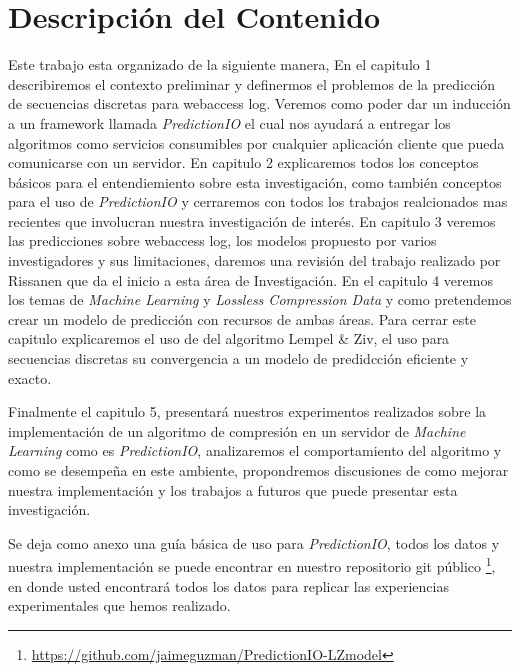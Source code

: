 \section{Descripción del Contenido}

Este trabajo esta organizado de la siguiente manera, En el capitulo 1 describiremos el contexto preliminar y definermos el problemos de la predicción de secuencias discretas para webaccess log. Veremos como poder dar un inducción a un framework llamada \emph{PredictionIO} el cual nos ayudará a entregar los algoritmos como servicios consumibles por cualquier aplicación cliente que pueda comunicarse con un servidor.
En capitulo 2 explicaremos todos los conceptos básicos para el entendiemiento sobre esta investigación, como también conceptos para el uso de \emph{PredictionIO} y cerraremos con todos los trabajos  realcionados mas recientes que involucran nuestra investigación de interés. En capitulo 3 veremos las predicciones sobre webaccess log, los modelos propuesto por varios investigadores y sus limitaciones, daremos una revisión del trabajo realizado por Rissanen\cite{Rissanen1984} que da el inicio a esta área de Investigación.
En el capitulo 4 veremos los temas de \emph{Machine Learning} y \emph{Lossless Compression Data} y como pretendemos crear un modelo de predicción con recursos de ambas áreas. Para cerrar este capitulo explicaremos el uso de del algoritmo Lempel \& Ziv, el uso para secuencias discretas su convergencia a un modelo de predidcción eficiente y exacto. 

Finalmente el capitulo 5, presentará nuestros experimentos realizados sobre la implementación de un algoritmo de compresión en un servidor de \emph{Machine Learning} como es \emph{PredictionIO}, analizaremos el comportamiento del algoritmo y como se desempeña en este ambiente, propondremos discusiones de como mejorar nuestra implementación y los trabajos a futuros que puede presentar esta investigación.

Se deja como anexo una guía básica de uso para \emph{PredictionIO}, todos los datos y nuestra implementación se puede encontrar en nuestro repositorio git público \footnote{\url{https://github.com/jaimeguzman/PredictionIO-LZmodel}}, en donde usted encontrará todos los datos para replicar las experiencias experimentales que hemos realizado. 





